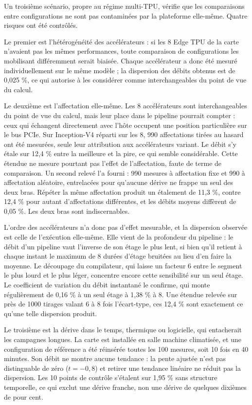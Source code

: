 \documentclass[11pt,a4paper]{report}
\begin{document}
Un troisième scénario, propre au régime multi-TPU, vérifie que les comparaisons entre configurations ne sont pas contaminées par la plateforme elle-même. Quatre risques ont été contrôlés.

Le premier est l'hétérogénéité des accélérateurs : si les 8 Edge TPU de la carte n'avaient pas les mêmes performances, toute comparaison de configurations les mobilisant différemment serait biaisée. Chaque accélérateur a donc été mesuré individuellement sur le même modèle ; la dispersion des débits obtenus est de 0,025 \%, ce qui autorise à les considérer comme interchangeables du point de vue du calcul.

Le deuxième est l'affectation elle-même. Les 8 accélérateurs sont interchangeables du point de vue du calcul, mais leur place dans le pipeline pourrait compter : ceux qui échangent directement avec l'hôte occupent une position particulière sur le bus PCIe. Sur Inception-V4 réparti sur les 8, 990 affectations tirées au hasard ont été mesurées, seule leur attribution aux accélérateurs variant. Le débit s'y étale sur 12,4 \% entre la meilleure et la pire, ce qui semble considérable. Cette étendue ne mesure pourtant pas l'effet de l'affectation, faute de terme de comparaison. Un second relevé l'a fourni : 990 mesures à affectation fixe et 990 à affectation aléatoire, entrelacées pour qu'aucune dérive ne frappe un seul des deux bras. Répéter la même affectation produit un étalement de 11,3 \%, contre 12,4 \% pour autant d'affectations différentes, et les débits moyens diffèrent de 0,05 \%. Les deux bras sont indiscernables.

L'ordre des accélérateurs n'a donc pas d'effet mesurable, et la dispersion observée est celle de l'exécution elle-même. Elle vient de la profondeur du pipeline : le débit d'un pipeline vaut l'inverse de son étage le plus lent, si bien qu'il retient à chaque instant le maximum de 8 durées d'étage bruitées au lieu d'en faire la moyenne. Le découpage du compilateur, qui laisse un facteur 6 entre le segment le plus lourd et le plus léger, concentre encore cette sensibilité sur un seul étage. Le coefficient de variation du débit instantané le confirme, qui monte régulièrement de 0,16 \% à un seul étage à 1,38 \% à 8. Une étendue relevée sur près de 1000 tirages valant 6 à 8 fois l'écart-type, ces 12,4 \% sont exactement ce qu'une telle dispersion produit.

Le troisième est la dérive dans le temps, thermique ou logicielle, qui entacherait les campagnes longues. La carte est installée en salle machine climatisée, et une configuration de référence a été réinsérée toutes les 100 mesures, soit 10 fois en 40 minutes. Son débit ne montre aucune tendance : la pente ajustée n'est pas distinguable de zéro ($t = -0{,}8$) et retirer une tendance linéaire ne réduit pas la dispersion. Les 10 points de contrôle s'étalent sur 1,95 \% sans structure temporelle, ce qui exclut une dérive franche, non une dérive de quelques dixièmes de pour cent.
\end{document}
